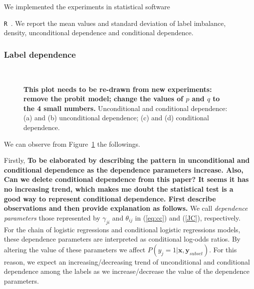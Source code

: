 \documentclass[review]{elsarticle}
\begin{document}
We implemented the experiments in statistical software {\texttt{R}~\citep{RR}. We report the mean values and standard deviation of label imbalance, density, unconditional dependence and conditional dependence.

\subsubsection{Label dependence}

\begin{figure}[H]
    \begin{center}
    \\
		\end{center}
    \caption{{\bf This plot needs to be re-drawn from new experiments: remove the probit model; change the values of $p$ and $q$ to the 4 small numbers.} Unconditional and conditional dependence: (a) and (b) unconditional dependence; (c) and (d) conditional dependence.}
    \label{fig:results:dep}
\end{figure}

We can observe from Figure~\ref{fig:results:dep} the followings.

Firstly, {\bf To be elaborated by describing the pattern in unconditional and conditional dependence as the dependence parameters increase.  Also, Can we delete conditional dependence from this paper?  It seems it has no increasing trend, which makes me doubt the statistical test is a good way to represent conditional dependence. First describe observations and then provide explanation as follows.}
We call \emph{dependence parameters} those represented by $\gamma_{ji}$ and $\theta_{ij}$ in (\ref{eq:cc}) and (\ref{JC}), respectively. For the chain of logistic regressions and conditional logistic regressions models, these dependence parameters are interpreted as conditional log-odds ratios. By altering the value of these parameters we affect $P(y_{j} = 1|\mathbf{x},\mathbf{y}_{subset})$. For this reason, we expect an increasing/decreasing trend of unconditional and conditional dependence among the labels as we increase/decrease the value of the dependence parameters. 

}
\end{document}
